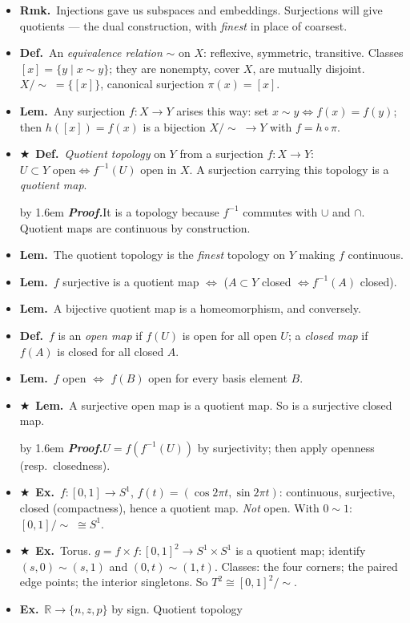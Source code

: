 \documentclass[12pt,a4paper]{article}
\newcommand{\Dfn}{\textbf{Def.}~}
\newcommand{\Lem}{\textbf{Lem.}~}
\newcommand{\Exa}{\textbf{Ex.}~}
\newcommand{\Rmk}{\textbf{Rmk.}~}
\newcommand{\Key}{$\bigstar$~}                  %
\newcommand{\Pf}[1]{%
  \par\addvspace{7pt}\nopagebreak
  \begingroup
    \advance\leftskip by 1.6em
    \parindent=0pt \small\color{prf}%
    \textbf{\textit{Proof.}}\enspace #1\par
  \endgroup
  \addvspace{9pt}}
\newenvironment{BL}%
  {\begin{itemize}[leftmargin=1.4em,labelsep=0.55em,itemsep=11pt,topsep=11pt,parsep=0pt]}%
  {\end{itemize}}
\newcommand{\RR}{\mathbb{R}}
\renewcommand{\iff}{\Leftrightarrow}
\begin{document}
\begin{BL}
\item \Rmk Injections gave us subspaces and embeddings. Surjections will give quotients ---
      the dual construction, with \emph{finest} in place of coarsest.
\item \Dfn An \emph{equivalence relation} $\sim$ on $X$: reflexive, symmetric, transitive.
      Classes $[x]=\{y\mid x\sim y\}$; they are nonempty, cover $X$, are mutually disjoint.
      $X/\!\!\sim\;=\{[x]\}$, canonical surjection $\pi(x)=[x]$.
\item \Lem Any surjection $f\colon X\to Y$ arises this way: set $x\sim y\iff f(x)=f(y)$;
      then $h([x])=f(x)$ is a bijection $X/\!\!\sim\;\to Y$ with $f=h\circ\pi$.
\item \Key\Dfn \emph{Quotient topology} on $Y$ from a surjection $f\colon X\to Y$:
      \(U\subset Y\text{ open}\iff f^{-1}(U)\text{ open in }X.\)
      A surjection carrying this topology is a \emph{quotient map}.
\Pf{It is a topology because $f^{-1}$ commutes with $\cup$ and $\cap$. Quotient maps are
continuous by construction.}
\item \Lem The quotient topology is the \emph{finest} topology on $Y$ making $f$ continuous.
\item \Lem $f$ surjective is a quotient map $\iff$ ($A\subset Y$ closed $\iff f^{-1}(A)$ closed).
\item \Lem A bijective quotient map is a homeomorphism, and conversely.
\item \Dfn $f$ is an \emph{open map} if $f(U)$ is open for all open $U$;
      a \emph{closed map} if $f(A)$ is closed for all closed $A$.
\item \Lem $f$ open $\iff$ $f(B)$ open for every basis element $B$.
\item \Key\Lem A surjective open map is a quotient map. So is a surjective closed map.
\Pf{$U=f(f^{-1}(U))$ by surjectivity; then apply openness (resp.\ closedness).}
\item \Key\Exa $f\colon[0,1]\to S^1$, $f(t)=(\cos2\pi t,\sin2\pi t)$: continuous, surjective,
      closed (compactness), hence a quotient map. \emph{Not} open.
      With $0\sim1$: $[0,1]/\!\!\sim\;\cong S^1$.
\item \Key\Exa Torus. $g=f\times f\colon[0,1]^2\to S^1\times S^1$ is a quotient map;
      identify $(s,0)\sim(s,1)$ and $(0,t)\sim(1,t)$. Classes: the four corners; the paired
      edge points; the interior singletons. So $T^2\cong[0,1]^2/\!\!\sim$.
\item \Exa $\RR\to\{n,z,p\}$ by sign. Quotient topology

\end{BL}
\end{document}
